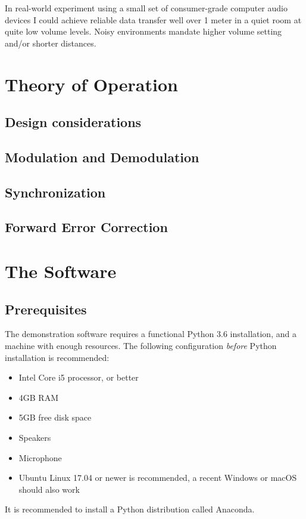 \documentclass[a4paper]{article}
\begin{document}
In real-world experiment using a small set of consumer-grade computer 
audio devices I could achieve reliable data transfer well over 1 meter 
in a quiet room at quite low volume levels. Noisy environments mandate 
higher volume setting and/or shorter distances. \section{Theory of 
Operation} \subsection{Design considerations} \subsection{Modulation 
and Demodulation} \subsection{Synchronization} \subsection{Forward 
Error Correction} \section{The Software} \label{sec:thesoftware}

\subsection{Prerequisites}

The demonstration software requires a functional Python 3.6 
installation, and a machine with enough resources. The following 
configuration \textit{before} Python installation is recommended:

\begin{itemize}
\item Intel Core i5 processor, or better
\item 4GB RAM
\item 5GB free disk space
\item Speakers
\item Microphone
\item Ubuntu Linux 17.04 or newer is recommended, a recent Windows or
macOS should also work
\end{itemize}

It is recommended to install a Python distribution called 
Anaconda\cite{ana1}.
\end{document}
